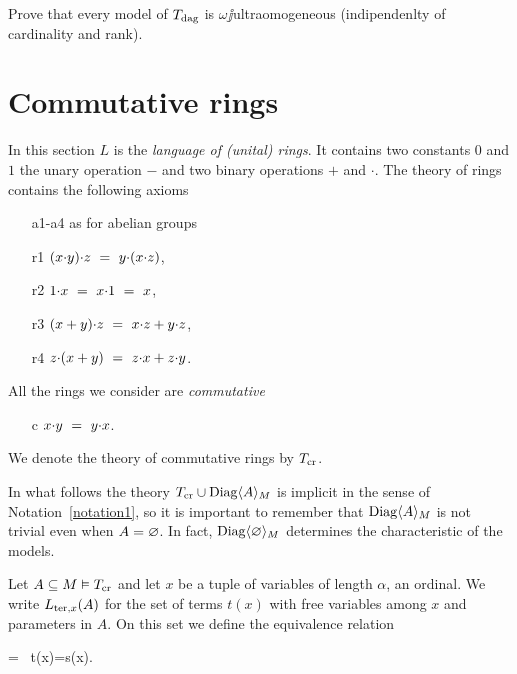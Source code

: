 \documentclass[creche.tex]{subfiles}
\begin{document}
\begin{exercise}
Prove that every model of $T_{\rm dag}$ is $\omega\jj$ultraomogeneous (indipendenlty of cardinality and rank).\QED
\end{exercise}

\section{Commutative rings}
\label{anelli}

In this section $L$ is the \emph{language of (unital) rings}. It contains two constants $0$ and $1$ the unary operation $-$ and two binary operations $+$ and $\cdot$. The theory of rings contains the following axioms

\begin{itemize}
\item[a1-a4] as for abelian groups
\item[r1] $(x\mdot y)\mdot z\  =\ y\mdot(x\mdot z)$,
\item[r2] $1\mdot x\ =\ x\mdot 1\ =\ x$,
\item[r3] $(x+y)\mdot z\ =\ x\mdot z + y\mdot z$,
\item[r4] $z\mdot (x+y)\ =\ z\mdot x + z\mdot y$.
\end{itemize}

All the rings we consider are \emph{commutative\/} 

\begin{itemize}
\item[c] $x\mdot y\ =\ y\mdot x$.
\end{itemize}
 
We denote the theory of commutative rings by \emph{$T_{\rm cr}$}.

In what follows the theory $T_{\rm cr}\cup\Diag\<A\>_M$ is implicit in the sense of Notation~\ref{notation1}, so it is important to remember that $\Diag\<A\>_M$ is not trivial even when $A=\0$. In fact, $\Diag\<\0\>_M$ determines the characteristic of the models.

Let  $A\subseteq M\models T_{\rm cr}$ and let $x$ be a tuple of variables of length $\alpha$, an ordinal. We write $L_{{\rm ter},x}(A)$ for the set of terms $t(x)$ with free variables among $x$ and parameters in $A$. On this set we define the equivalence relation

%
{=}%
{\proves \ t(x)=s(x).}
\end{document}
